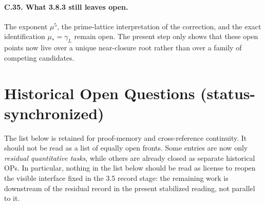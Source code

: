 \paragraph{C.35. What 3.8.3 still leaves open.}
The exponent \(\mu^5\), the prime-lattice interpretation of the correction, and the exact identification \(\mu_\ast=\gamma_L\) remain open. The present step only shows that these open points now live over a unique near-closure root rather than over a family of competing candidates.



\section*{Historical Open Questions (status-synchronized)}
The list below is retained for proof-memory and cross-reference continuity.
It should not be read as a list of equally open fronts. Some entries are now
only \emph{residual quantitative tasks}, while others are already closed as
separate historical OPs. In particular, nothing in the list below should be
read as license to reopen the visible interface fixed in the 3.5 record stage:
the remaining work is downstream of the residual record in the present stabilized reading, not parallel to it.

